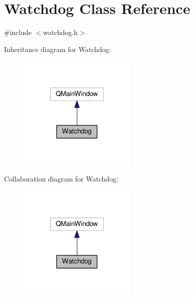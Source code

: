 \hypertarget{classWatchdog}{}\section{Watchdog Class Reference}
\label{classWatchdog}


{\ttfamily \#include $<$watchdog.\+h$>$}



Inheritance diagram for Watchdog\+:\nopagebreak
\begin{figure}[H]
\begin{center}
\leavevmode
\includegraphics[width=160pt]{classWatchdog__inherit__graph}
\end{center}
\end{figure}


Collaboration diagram for Watchdog\+:\nopagebreak
\begin{figure}[H]
\begin{center}
\leavevmode
\includegraphics[width=160pt]{classWatchdog__coll__graph}
\end{center}
\end{figure}
